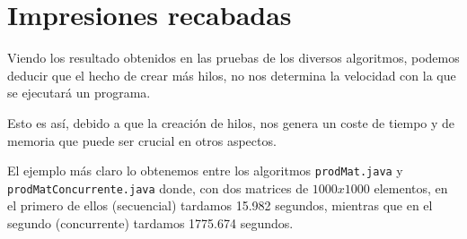 \documentclass[12pt,letterpaper]{article}
\begin{document}
\newpage
\section{Impresiones recabadas}

Viendo los resultado obtenidos en las pruebas de los diversos algoritmos, podemos deducir que el hecho de crear más hilos, no nos determina la velocidad con la que se ejecutará un programa.

Esto es así, debido a que la creación de hilos, nos genera un coste de tiempo y de memoria que puede ser crucial en otros aspectos.

El ejemplo más claro lo obtenemos entre los algoritmos \texttt{prodMat.java} y\\ \texttt{prodMatConcurrente.java} donde, con dos matrices de $1000x1000$ elementos, en el primero de ellos (secuencial) tardamos 15.982 segundos, mientras que en el segundo (concurrente) tardamos 1775.674 segundos.
\end{document}
